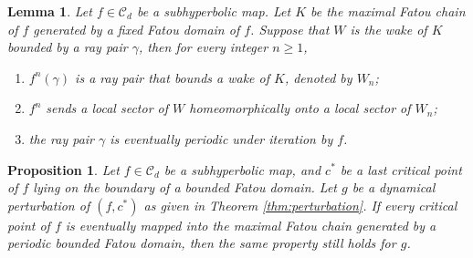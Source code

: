 \documentclass[10pt,a4paper]{amsart}
\newtheorem{proposition}{Proposition}
\newtheorem{lemma}{Lemma}
\def\CCCC{\mathscr C}
\def\g{\gamma}
\begin{document}
\begin{lemma}\label{pro:wake}
	Let $f\in\CCCC_d$ be a subhyperbolic map. Let $K$ be the maximal Fatou chain of $f$ generated by a fixed Fatou domain of $f$. Suppose that $W$ is the wake of $K$ bounded by a ray pair $\g$, then for every integer $n\geq 1$,
	\begin{enumerate}
		\item $f^n(\g)$ is  a ray pair that bounds a wake of $K$, denoted by $W_n$;
		\item $f^n$ sends a local sector of $W$ homeomorphically onto a local sector of $W_n$;
		\item the ray pair $\g$ is eventually periodic under iteration by $f$.
	\end{enumerate}
\end{lemma}

\begin{proposition}\label{pro:same}
	Let $f\in\CCCC_d$ be a subhyperbolic map, and $c^*$ be a last critical point of $f$ lying on the boundary of a bounded Fatou domain. Let $g$ be a dynamical perturbation of $(f,c^*)$ as given in Theorem \ref{thm:perturbation}. If every critical point of $f$ is eventually mapped into the maximal Fatou chain generated by a periodic bounded Fatou domain, then the same property still holds for $g$.
\end{proposition}
\end{document}
